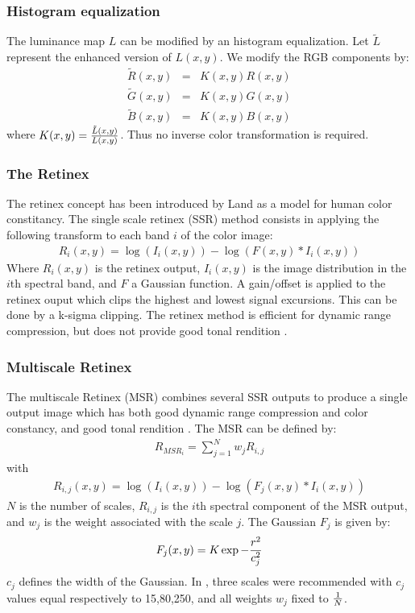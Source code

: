 
\subsubsection*{Histogram equalization}
The luminance map $L$ can be modified by an histogram equalization. 
Let $\tilde L$ represent the enhanced version of $L(x,y)$.
We modify the RGB components by:
\begin{eqnarray}
\tilde R(x,y) & = & K(x,y) R(x,y) \nonumber  \\
\tilde G(x,y) & = & K(x,y) G(x,y) \nonumber  \\
\tilde B(x,y) & = & K(x,y) B(x,y)
\end{eqnarray}
where $K(x,y) = {\tilde L(x,y) \over L(x,y)}$.
Thus no inverse color transformation is required.

\subsubsection*{The Retinex}
The retinex concept has been introduced by Land \cite{col:land86} as a model
for human color constitancy. 
The single scale retinex (SSR) method \cite{col:jobson97a} consists in
applying the following transform to each band $i$ of the color image:
\begin{eqnarray}
R_i(x,y) = \log( I_i(x,y)) - \log(F(x,y) * I_i(x,y)) 
\end{eqnarray}
Where $R_i(x,y)$ is the retinex output, $I_i(x,y)$ is the image 
distribution in the $i$th spectral band, and $F$ a Gaussian function.
A gain/offset is applied to the retinex ouput which clips the highest and
lowest signal excursions. This can be done by a k-sigma clipping.
The retinex method is efficient for dynamic range compression, but does not provide good
tonal rendition \cite{col:rahman96}. 

\subsubsection*{Multiscale Retinex}
The multiscale Retinex (MSR) combines several SSR outputs to produce 
a single output image which has both good dynamic range compression and
color constancy, and good tonal rendition \cite{col:jobson97b}.
The MSR can be defined by:
\begin{eqnarray}
R_{MSR_i} = \sum_{j=1}^N w_j R_{i,j}
\end{eqnarray}
with 
\begin{eqnarray}
R_{i,j}(x,y) = \log( I_i(x,y)) - \log(F_j(x,y) * I_i(x,y)) 
\end{eqnarray}
$N$ is the number of scales, $R_{i,j}$ is the $i$th spectral
component of the MSR output, and $w_j$ is the weight associated with
the scale $j$. The Gaussian $F_j$ is given by:
\begin{eqnarray}
F_j(x,y) = K \exp{- {r^2 \over c_j^2}}
\end{eqnarray}
$c_j$ defines the width of the Gaussian.
In \cite{col:jobson97b}, three scales were recommended with $c_j$ values
equal respectively to 15,80,250, and all weights $w_j$ fixed to ${1 \over N}$.

